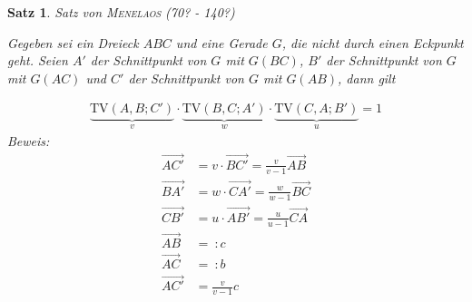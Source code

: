 \documentclass[%
a4paper,
11pt,		%
]
{scrartcl}
\newcommand{\TV}{\text{TV}}
\theoremstyle{plain}
\theoremstyle{plain}
\newtheorem{mysatz}[mydef]{Satz}
\theoremstyle{plain}
\theoremstyle{plain}
\theoremstyle{plain}
\newcommand{\ora}{\overrightarrow}
\begin{document}
\begin{mysatz}
    Satz von \textsc{Menelaos} (70? - 140?)

    \begin{minipage}{0.45\textwidth}
        Gegeben sei ein Dreieck $ABC$ und eine Gerade $G$, die nicht durch einen Eckpunkt geht. Seien $A'$ der Schnittpunkt von $G$ mit $G(BC)$, $B'$ der Schnittpunkt von $G$ mit $G(AC)$ und $C'$ der Schnittpunkt von $G$ mit $G(AB)$, dann gilt
    \end{minipage}
    \begin{minipage}{0.55\textwidth}
        \begin{center}
        \end{center}
    \end{minipage}
    \begin{align*}
        \underbrace{\TV(A,B;C')}_{v}
        \cdot
        \underbrace{\TV(B,C;A')}_{w}
        \cdot
        \underbrace{\TV(C,A;B')}_{u}
        = 1
    \end{align*}
    \textit{Beweis:}
    \begin{align*}
        \ora{AC'} & = v \cdot \ora{BC'} = \frac{v}{v-1} \ora{AB}\\
        \ora{BA'} & = w \cdot \ora{CA'} = \frac{w}{w-1} \ora{BC}\\
        \ora{CB'} & = u \cdot \ora{AB'} = \frac{u}{u-1} \ora{CA}\\
        \ora{AB} & =\ : c\\
        \ora{AC} & =\ : b\\
        \ora{AC'} & = \frac{v}{v-1} c\\

\end{align*}
\end{mysatz}
\end{document}
